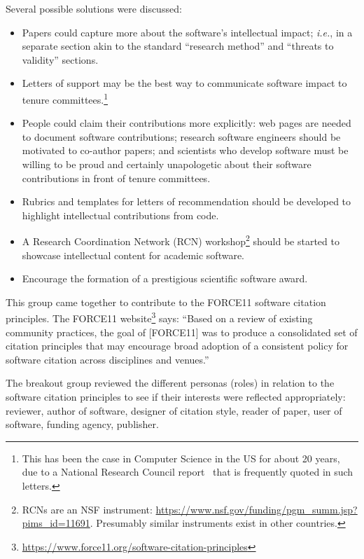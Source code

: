 \documentclass[a4paper,UKenglish]{dagrep}
\newcommand{\ie}{\emph{i.e.},\xspace}
\begin{document}
Several possible solutions were discussed: %
\begin{itemize}
	\item Papers could capture more about the software's intellectual impact; \ie in a separate section akin to the standard ``research method'' and ``threats to validity'' sections.
    \item Letters of support may be the best way to communicate software impact to tenure committees.\footnote{This has been the case in Computer Science in the US for about 20 years, due to a National Research Council report~\cite{NRC-CS-1994} that is frequently quoted in such letters.}
    \item People could claim their contributions more explicitly:
    	web pages are needed to document software contributions;
		research software engineers should be motivated to co-author papers;
		and scientists who develop software must be willing to be proud and certainly unapologetic about their software contributions in front of tenure committees.
    \item Rubrics and templates for letters of recommendation should be developed to highlight intellectual contributions from code.
    \item A Research Coordination Network (RCN) workshop\footnote{RCNs are an NSF instrument: \url{https://www.nsf.gov/funding/pgm_summ.jsp?pims_id=11691}. Presumably similar instruments exist in other countries.} should be started to showcase intellectual content for academic software.
    \item Encourage the formation of a prestigious scientific software award.
\end{itemize}


This group came together to contribute to the FORCE11 software citation principles. The FORCE11 website\footnote{\url{https://www.force11.org/software-citation-principles}} says: ``Based on a review of existing community practices, the goal of [FORCE11] was to produce a consolidated set of citation principles that may encourage broad adoption of a consistent policy for software citation across disciplines and venues.''

The breakout group reviewed the different personas (roles) in relation to the software citation principles to see if their interests were reflected appropriately:
reviewer, author of software, designer of citation style, reader of paper, user of software, funding agency, publisher.
\end{document}
